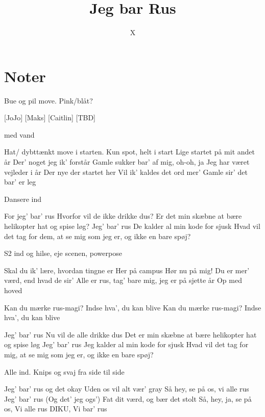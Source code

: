 \documentclass{article}
\title{Jeg bar Rus}
\author{X}
\begin{document}
                
\maketitle
\section*{Noter} 
Bue og pil move. Pink/blåt?
\begin{roles}
[JoJo]
[Maks]
[Caitlin]
[TBD]
\end{roles}

\begin{props}

 med vand
\end{props}

\newpage%
\begin{song}
\scene Hat/ dybttænkt move i starten. Kun spot, helt i start
Lige startet på mit andet år
Der’ noget jeg ik’ forstår 
Gamle sukker bar’ af mig, oh-oh, ja
Jeg har været vejleder i år
Der nye der startet her
Vil ik’ kaldes det ord mer’
Gamle sir’ det bar’ er leg

\scene Dansere ind

For jeg’ bar’ rus
Hvorfor vil de ikke drikke dus?
Er det min skæbne at bære helikopter hat og spise løg?
Jeg’ bar’ rus
De kalder al min kode for sjusk
Hvad vil det tag for dem, at se mig som jeg er, og ikke en bare spøj? 

\scene S2 ind og hilse, eje scenen, powerpose

Skal du ik’ lære, hvordan tingne er 
Her på campus
Hør nu på mig! Du er mer’ værd, end hvad de sir’
Alle er rus, tag’ bare mig, jeg er på sjette år
Op med hoved

Kan du mærke rus-magi?
Indse hva’, du kan blive
Kan du mærke rus-magi?
Indse hva’, du kan blive

Jeg’ bar’ rus
Nu vil de alle drikke dus
Det er min skæbne at bære helikopter hat og spise løg
Jeg’ bar’ rus
Jeg kalder al min kode for sjusk
Hvad vil det tag for mig, at se mig som jeg er, og ikke en bare spøj? 

\scene Alle ind. Knips og svaj fra side til side

 Jeg’ bar’ rus og det okay
Uden os vil alt vær’ gray
Så hey, se på os, vi alle rus
Jeg’ bar’ rus (Og det’ jeg ogs’)
Fat dit værd, og bær det stolt
Så, hey, ja, se på os, Vi alle rus
DIKU, Vi bar’ rus 

\end{song}
\end{document}
